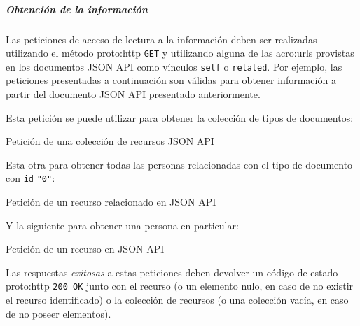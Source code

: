 
\subparagraph{Obtención de la información}

Las peticiones de acceso de lectura a la información deben ser realizadas utilizando el método \gls{proto:http} \texttt{GET} y utilizando alguna de las \glspl{acro:url} provistas en los documentos JSON API como vínculos \texttt{self} o \texttt{related}. Por ejemplo, las peticiones presentadas a continuación son válidas para obtener información a partir del documento JSON API presentado anteriormente.

Esta petición se puede utilizar para obtener la colección de tipos de documentos:

\begin{listing}[H]
  \caption{Petición de una colección de recursos JSON API}
  \label{soa:tecnologias:json-api:obtener-colecccion}
\end{listing}

Esta otra para obtener todas las personas relacionadas con el tipo de documento con \texttt{id} \texttt{"0"}:

\begin{listing}[H]
  \caption{Petición de un recurso relacionado en JSON API}
  \label{soa:tecnologias:json-api:obtener-recurso-relacionado}
\end{listing}

Y la siguiente para obtener una persona en particular:

\begin{listing}[H]
  \caption{Petición de un recurso en JSON API}
  \label{soa:tecnologias:json-api:obtener-recurso}
\end{listing}

Las respuestas \textit{exitosas} a estas peticiones deben devolver un código de estado \gls{proto:http} \texttt{200 OK} junto con el recurso (o un elemento nulo, en caso de no existir el recurso identificado) o la colección de recursos (o una colección vacía, en caso de no poseer elementos).
